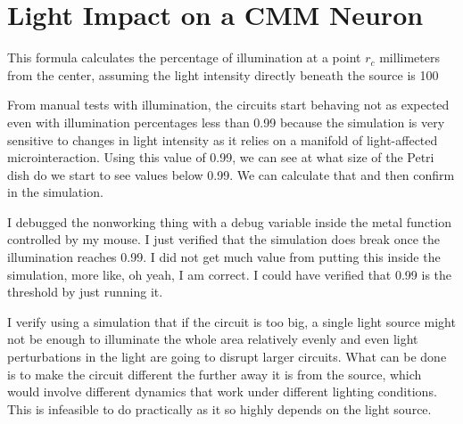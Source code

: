 \section{Light Impact on a CMM Neuron \citep{stovold2017reaction}}
This formula calculates the percentage of illumination at a point \( r_c \) millimeters from the center, assuming the light intensity directly beneath the source is 100%


From manual tests with illumination, the circuits start behaving not as expected even with illumination percentages less than 0.99 because the simulation is very sensitive to changes in light intensity as it relies on a manifold of light-affected microinteraction. Using this value of 0.99, we can see at what size of the Petri dish do we start to see values below 0.99. We can calculate that and then confirm in the simulation. 


I debugged the nonworking thing with a debug variable inside the metal function controlled by my mouse. 
I just verified that the simulation does break once the illumination reaches 0.99. I did not get much value from putting this inside the simulation, more like, oh yeah, I am correct.
I could have verified that 0.99 is the threshold by just running 
it.

I verify using a simulation that if the circuit is too big, a single light source might not be enough to illuminate the whole area relatively evenly and even light perturbations in the light are going to disrupt larger circuits. 
What can be done is to make the circuit different the further away it is from the source, which would involve different dynamics that work under different lighting conditions. This is infeasible to do practically as it so highly depends on the light source. 

